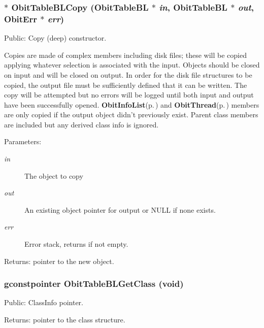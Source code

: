 \subsubsection{$\ast$ Obit\-Table\-BLCopy ({\bf Obit\-Table\-BL} $\ast$ {\em in}, {\bf Obit\-Table\-BL} $\ast$ {\em out}, {\bf Obit\-Err} $\ast$ {\em err})}\label{ObitTableBL_8c_a20}


Public: Copy (deep) constructor. 

Copies are made of complex members including disk files; these will be copied applying whatever selection is associated with the input. Objects should be closed on input and will be closed on output. In order for the disk file structures to be copied, the output file must be sufficiently defined that it can be written. The copy will be attempted but no errors will be logged until both input and output have been successfully opened. {\bf Obit\-Info\-List}{\rm (p.\,\pageref{structObitInfoList})} and {\bf Obit\-Thread}{\rm (p.\,\pageref{structObitThread})} members are only copied if the output object didn't previously exist. Parent class members are included but any derived class info is ignored. \begin{Desc}
\item[Parameters:]
\begin{description}
\item[{\em in}]The object to copy \item[{\em out}]An existing object pointer for output or NULL if none exists. \item[{\em err}]Error stack, returns if not empty. \end{description}
\end{Desc}
\begin{Desc}
\item[Returns:]pointer to the new object. \end{Desc}
\subsubsection{\setlength{\rightskip}{0pt plus 5cm}gconstpointer Obit\-Table\-BLGet\-Class (void)}\label{ObitTableBL_8c_a17}


Public: Class\-Info pointer. 

\begin{Desc}
\item[Returns:]pointer to the class structure. \end{Desc}

